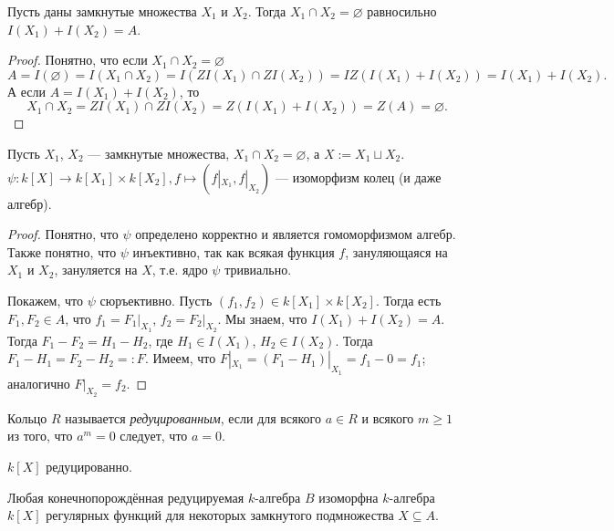 \documentclass[12pt,a4paper]{article}
\begin{document}
    \begin{lemma}
        Пусть даны замкнутые множества $X_1$ и $X_2$. Тогда $X_1 \cap X_2 = \varnothing$ равносильно $I(X_1) + I(X_2) = A$.
    \end{lemma}

    \begin{proof}
        Понятно, что если $X_1 \cap X_2 = \varnothing$
        \[A = I(\varnothing) = I(X_1 \cap X_2) = I(ZI(X_1) \cap ZI(X_2)) = IZ(I(X_1) + I(X_2)) = I(X_1) + I(X_2).\]
        А если $A = I(X_1) + I(X_2)$, то
        \[X_1 \cap X_2 = ZI(X_1) \cap ZI(X_2) = Z(I(X_1) + I(X_2)) = Z(A) = \varnothing.\]
    \end{proof}

    \begin{theorem}
        Пусть $X_1$, $X_2$ --- замкнутые множества, $X_1 \cap X_2 = \varnothing$, а $X := X_1 \sqcup X_2$. $\psi: k[X] \to k[X_1] \times k[X_2], f \mapsto (f|_{X_1}, f|_{X_2})$ --- изоморфизм колец (и даже алгебр).
    \end{theorem}

    \begin{proof}
        Понятно, что $\psi$ определено корректно и является гомоморфизмом алгебр. Также понятно, что $\psi$ инъективно, так как всякая функция $f$, зануляющаяся на $X_1$ и $X_2$, зануляется на $X$, т.е. ядро $\psi$ тривиально.

        Покажем, что $\psi$ сюръективно. Пусть $(f_1, f_2) \in k[X_1] \times k[X_2]$. Тогда есть $F_1, F_2 \in A$, что $f_1 = F_1|_{X_1}$, $f_2 = F_2|_{X_2}$. Мы знаем, что $I(X_1) + I(X_2) = A$. Тогда $F_1 - F_2 = H_1 - H_2$, где $H_1 \in I(X_1)$, $H_2 \in I(X_2)$. Тогда $F_1 - H_1 = F_2 - H_2 =: F$. Имеем, что $F|_{X_1} = (F_1 - H_1)|_{X_1} = f_1 - 0 = f_1$; аналогично $F|_{X_2} = f_2$.
    \end{proof}

    \begin{definition}
        Кольцо $R$ называется \emph{редуцированным}, если для всякого $a \in R$ и всякого $m \geqslant 1$ из того, что $a^m = 0$ следует, что $a = 0$.
    \end{definition}

    \begin{remark*}
        $k[X]$ редуцированно.
    \end{remark*}

    \begin{lemma}
        Любая конечнопорождённая редуцируемая $k$-алгебра $B$ изоморфна $k$-алгебра $k[X]$ регулярных функций для некоторых замкнутого подмножества $X \subseteq A$.
    \end{lemma}
\end{document}
